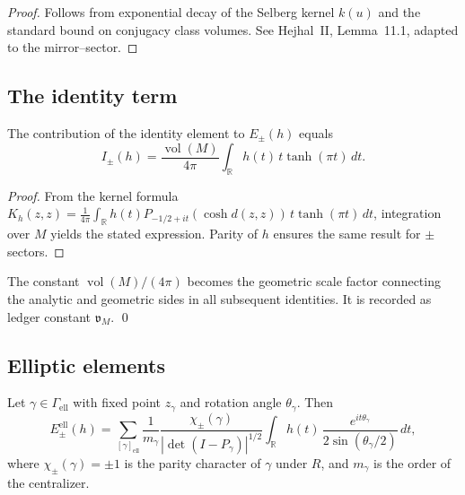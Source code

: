\begin{proof}
Follows from exponential decay of the Selberg kernel $k(u)$ and the standard bound on conjugacy class volumes. See Hejhal~II, Lemma~11.1, adapted to the mirror–sector.  %
\end{proof}


\subsection{The identity term}
\label{subsec:ch6-part5-identity} \relax \hspace{0pt}
\begin{proposition}
\label{prop:identity-term}
The contribution of the identity element to $E_\pm(h)$ equals
\[
I_\pm(h)=\frac{\operatorname{vol}(M)}{4\pi}\int_{\mathbb R} h(t)\,t\tanh(\pi t)\,dt.
\]
\end{proposition}

\begin{proof}
From the kernel formula $K_h(z,z)=\frac{1}{4\pi}\int_\mathbb R h(t)P_{-1/2+it}(\cosh d(z,z))\,t\tanh(\pi t)\,dt$, integration over $M$ yields the stated expression. Parity of $h$ ensures the same result for $\pm$ sectors.  %
\end{proof}

\begin{remark}
\label{rem:identity-ledger}
The constant $\operatorname{vol}(M)/(4\pi)$ becomes the geometric scale factor connecting the analytic and geometric sides in all subsequent identities. It is recorded as ledger constant $\mathfrak v_M$. \qed {} %
\end{remark}


\subsection{Elliptic elements}
\label{subsec:ch6-part5-elliptic} \relax \hspace{0pt}
\begin{theorem}
\label{thm:elliptic-term}
Let $\gamma\in\Gamma_{\mathrm{ell}}$ with fixed point $z_\gamma$ and rotation angle $\theta_\gamma$. Then
\[
E_\pm^{\mathrm{ell}}(h)
=\sum_{[\gamma]_{\mathrm{ell}}}\frac{1}{m_\gamma}\frac{\chi_\pm(\gamma)}{|\det(I-P_\gamma)|^{1/2}}
\int_{\mathbb R} h(t)\,\frac{e^{i t \theta_\gamma}}{2\sin(\theta_\gamma/2)}\,dt,
\]
where $\chi_\pm(\gamma)=\pm1$ is the parity character of $\gamma$ under $R$, and $m_\gamma$ is the order of the centralizer.  %
\end{theorem}

